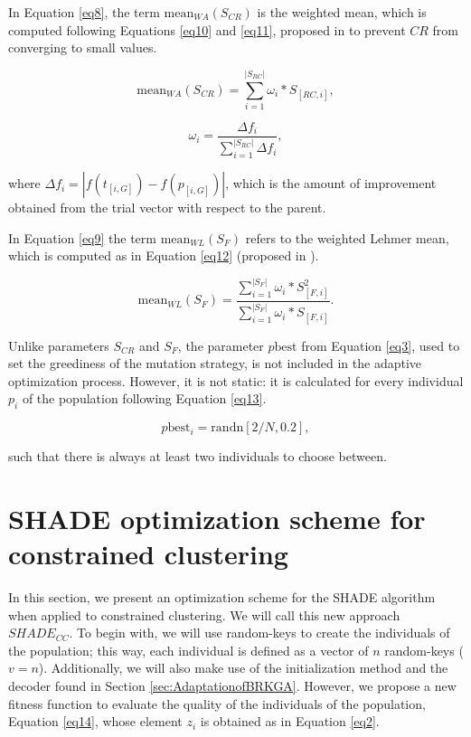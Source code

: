 \documentclass[review]{elsarticle}
\begin{document}
In Equation \ref{eq8}, the term $\text{mean}_{WA} (S_{CR})$ is the weighted mean, which is computed following Equations \eqref{eq10} and \eqref{eq11}, proposed in \cite{peng2009multi} to prevent $CR$ from converging to small values.

\begin{equation}
\text{mean}_{WA} (S_{CR}) = \sum_{i = 1}^{|S_{RC}|} \omega_i * S_{[RC,i]},
\label{eq10}
\end{equation}

\begin{equation}
\omega_i = \frac{\Delta f_i}{\sum_{i = 1}^{|S_{RC}|} \Delta f_i},
\label{eq11}
\end{equation}

\noindent where $\Delta f_i = |f(t_{[i,G]}) - f(p_{[i, G]})|$, which is the amount of improvement obtained from the trial vector with respect to the parent.

In Equation \ref{eq9} the term $\text{mean}_{WL} (S_{F})$ refers to the weighted Lehmer mean, which is computed as in Equation \eqref{eq12} (proposed in \cite{tanabe2013success}).

\begin{equation}
\text{mean}_{WL} (S_{F}) = \frac{\sum_{i = 1}^{|S_{F}|} \omega_i * S^2_{[F,i]}}{\sum_{i = 1}^{|S_{F}|} \omega_i * S_{[F,i]}}.
\label{eq12}
\end{equation}

Unlike parameters $S_{CR}$ and $S_F$, the parameter $p\text{best}$ from Equation \eqref{eq3}, used to set the greediness of the mutation strategy, is not included in the adaptive optimization process. However, it is not static: it is calculated for every individual $p_i$ of the population following Equation \eqref{eq13}.

\begin{equation}
p\text{best}_i = \text{randn}[2/N, 0.2],
\label{eq13}
\end{equation}

\noindent such that there is always at least two individuals to choose between.

\section{SHADE optimization scheme for constrained clustering} \label{sec:SHADEadapt}

In this section, we present an optimization scheme for the SHADE algorithm when applied to constrained clustering. We will call this new approach $SHADE_{CC}$. To begin with, we will use random-keys to create the individuals of the population; this way, each individual is defined as a vector of $n$ random-keys ($v = n$). Additionally, we will also make use of the initialization method and the decoder found in Section \ref{sec:AdaptationofBRKGA}. However, we propose a new fitness function to evaluate the quality of the individuals of the population, Equation \eqref{eq14}, whose element $z_i$ is obtained as in Equation \eqref{eq2}.
\end{document}
